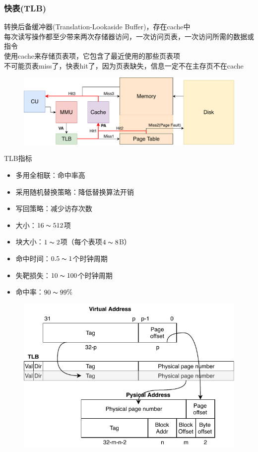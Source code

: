 \subsubsection{快表(TLB)}
转换后备缓冲器(Translation-Lookaside Buffer)，存在cache中\\
每次读写操作都至少带来两次存储器访问，一次访问页表，一次访问所需的数据或指令\\
使用cache来存储页表项，它包含了最近使用的那些页表项\\
不可能页表miss了，快表hit了，因为页表缺失，信息一定不在主存页不在cache
\begin{figure}[H]
\centering
\includegraphics[width=0.8\linewidth]{fig/Cache-page.pdf}
\end{figure}
TLB指标
\begin{itemize}
	\item 多用全相联：命中率高
	\item 采用随机替换策略：降低替换算法开销
	\item 写回策略：减少访存次数
	\item 大小：$16\thicksim 512$项
	\item 块大小：$1\thicksim 2$项（每个表项$4\thicksim 8$B）
	\item 命中时间：$0.5\thicksim 1$个时钟周期
	\item 失靶损失：$10\thicksim 100$个时钟周期
	\item 命中率：$90\thicksim 99\%$
\end{itemize}
\begin{figure}[H]
\centering
\includegraphics[width=0.6\linewidth]{fig/Cache-page_address.pdf}
\end{figure}

